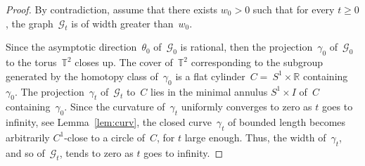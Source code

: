 \documentclass[AHL,Unicode,longabstracts,published]{cedram}
\newcommand{\GG}{\mathcal{G}}
\newcommand{\Z}{\mathbb{Z}}
\newcommand{\R}{\mathbb{R}}
\newcommand{\T}{\mathbb{T}}
\begin{document}
\begin{proof}
By contradiction, assume that there exists $w_0>0$ such that for every $t \geq 0$, the graph~$\GG_t$ is of width greater than~$w_0$.

Since the asymptotic direction~$\theta_0$ of~$\GG_0$ is rational, then the projection~$\gamma_0$ of~$\GG_0$ to the torus~$\T^2$ closes up. The cover of~$\T^2$ corresponding to the subgroup generated by the homotopy class of~$\gamma_0$ is a flat cylinder~$C=~S^1\times\R$ containing~$\gamma_0$. The projection~$\gamma_t$ of~$\GG_t$ to~$C$ lies in the minimal annulus $S^1\times I$ of~$C$ containing~$\gamma_0$. Since the curvature of~$\gamma_t$ uniformly converges to zero as $t$ goes to infinity, see Lemma~\ref{lem:curv}, the closed curve~$\gamma_t$ of bounded length becomes arbitrarily $C^1$-close to a circle of~$C$, for $t$ large enough. Thus, the width of~$\gamma_t$, and so of~$\GG_t$, tends to zero as $t$ goes to infinity.

\end{proof}
\end{document}
